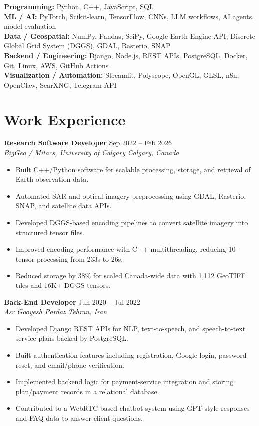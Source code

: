 \documentclass[a4paper,10pt]{article}
\newcommand{\resumeSubheading}[4]{
    \textbf{#1} \hfill #2 \\
    \textit{#3} \hfill \textit{#4}
}
\begin{document}
\textbf{Programming:} Python, C++, JavaScript, SQL \\
\textbf{ML / AI:} PyTorch, Scikit-learn, TensorFlow, CNNs, LLM workflows, AI agents, model evaluation \\
\textbf{Data / Geospatial:} NumPy, Pandas, SciPy, Google Earth Engine API, Discrete Global Grid System (DGGS), GDAL, Rasterio, SNAP \\
\textbf{Backend / Engineering:} Django, Node.js, REST APIs, PostgreSQL, Docker, Git, Linux, AWS, GitHub Actions \\
\textbf{Visualization / Automation:} Streamlit, Polyscope, OpenGL, GLSL, n8n, OpenClaw, SearXNG, Telegram API


\section*{Work Experience}

\resumeSubheading
{Research Software Developer}
{Sep 2022 -- Feb 2026}
{\href{https://biggeo.com}{BigGeo} / \href{https://www.mitacs.ca/}{Mitacs}, University of Calgary}
{Calgary, Canada}
\begin{itemize}[leftmargin=0.25in]
    \item Built C++/Python software for scalable processing, storage, and retrieval of Earth observation data.
    \item Automated SAR and optical imagery preprocessing using GDAL, Rasterio, SNAP, and satellite data APIs.
    \item Developed DGGS-based encoding pipelines to convert satellite imagery into structured tensor files.
    \item Improved encoding performance with C++ multithreading, reducing 10-tensor processing from 233s to 26s.
    \item Reduced storage by 38\% for scaled Canada-wide data with 1,112 GeoTIFF tiles and 16K+ DGGS tensors.
\end{itemize}

\resumeSubheading
{Back-End Developer}
{Jun 2020 -- Jul 2022}
{\href{https://asr-gooyesh.com/en/}{Asr Gooyesh Pardaz}}
{Tehran, Iran}
\begin{itemize}[leftmargin=0.25in]
    \item Developed Django REST APIs for NLP, text-to-speech, and speech-to-text service plans backed by PostgreSQL.
    \item Built authentication features including registration, Google login, password reset, and email/phone verification.
    \item Implemented backend logic for payment-service integration and storing plan/payment records in a relational database.
    \item Contributed to a WebRTC-based chatbot system using GPT-style responses and FAQ data to answer client questions.
\end{itemize}
\end{document}
